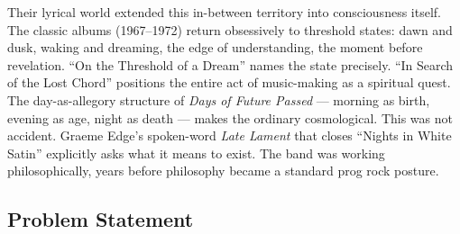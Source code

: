 \documentclass[11pt,letterpaper]{article}
\begin{document}
Their lyrical world extended this in-between territory into consciousness itself. The classic albums (1967--1972) return obsessively to threshold states: dawn and dusk, waking and dreaming, the edge of understanding, the moment before revelation. ``On the Threshold of a Dream'' names the state precisely. ``In Search of the Lost Chord'' positions the entire act of music-making as a spiritual quest. The day-as-allegory structure of \textit{Days of Future Passed} --- morning as birth, evening as age, night as death --- makes the ordinary cosmological. This was not accident. Graeme Edge's spoken-word \textit{Late Lament} that closes ``Nights in White Satin'' explicitly asks what it means to exist. The band was working philosophically, years before philosophy became a standard prog rock posture.

\subsection{Problem Statement}
\end{document}
